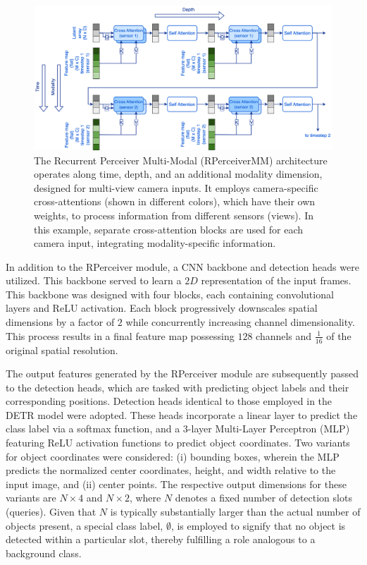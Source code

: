 \begin{figure}
    \centering
    \includegraphics[width=\textwidth]{figures/figure_methods_recurrent_perceiver_mm.png}
    \caption{The Recurrent Perceiver Multi-Modal (RPerceiverMM) architecture operates along time, depth, and an additional modality dimension, designed for multi-view camera inputs. It employs camera-specific cross-attentions (shown in different colors), which have their own weights, to process information from different sensors (views). In this example, separate cross-attention blocks are used for each camera input, integrating modality-specific information.}
    \label{fig:figure_methods_recurrent_perceiver_mm}
\end{figure}

In addition to the RPerceiver module, a CNN backbone and detection heads were utilized. This backbone served to learn a $2D$ representation of the input frames. This backbone was designed with four blocks, each containing convolutional layers and ReLU activation. Each block progressively downscales spatial dimensions by a factor of $2$ while concurrently increasing channel dimensionality. This process results in a final feature map possessing $128$ channels and $\frac{1}{16}$ of the original spatial resolution.

The output features generated by the RPerceiver module are subsequently passed to the detection heads, which are tasked with predicting object labels and their corresponding positions. Detection heads identical to those employed in the DETR model \cite{carionEndtoEndObjectDetection2020} were adopted. These heads incorporate a linear layer to predict the class label via a softmax function, and a $3$-layer Multi-Layer Perceptron (MLP) featuring ReLU activation functions to predict object coordinates. Two variants for object coordinates were considered: (i) bounding boxes, wherein the MLP predicts the normalized center coordinates, height, and width relative to the input image, and (ii) center points. The respective output dimensions for these variants are $N \times 4$ and $N \times 2$, where $N$ denotes a fixed number of detection slots (queries). Given that $N$ is typically substantially larger than the actual number of objects present, a special class label, $\emptyset$, is employed to signify that no object is detected within a particular slot, thereby fulfilling a role analogous to a background class.

